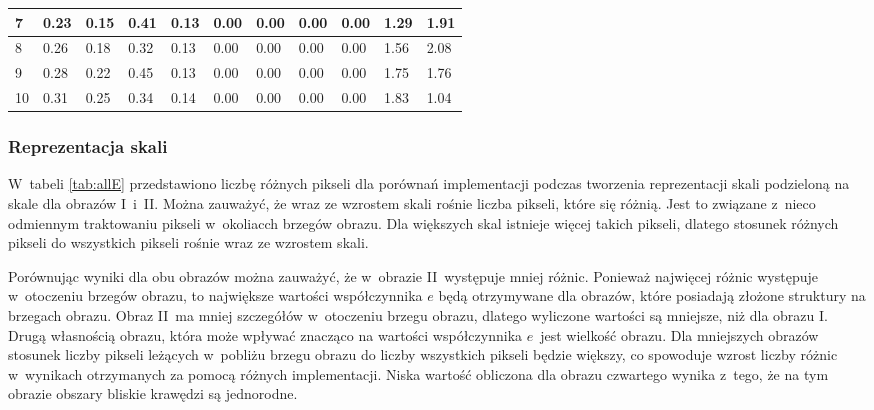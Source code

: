 {\begin{landscape}
\begin{table}[h]
\begin{tabular}{|p{0.8cm}|p{2cm}|p{2cm}|p{2cm}|p{2cm}|p{2cm}|p{2cm}|p{2cm}|p{2cm}|p{2cm}|p{2cm}|}
\multicolumn{1}{|l|}{7}        & 0.23                   & 0.15                   & 0.41                 & 0.13        & 0.00              & 0.00               & 0.00               & 0.00                & 1.29              & 1.91                    \\ \hline
\multicolumn{1}{|l|}{8}        & 0.26                   & 0.18                   & 0.32                 & 0.13        & 0.00              & 0.00               & 0.00               & 0.00                & 1.56              & 2.08                    \\ \hline
\multicolumn{1}{|l|}{9}        & 0.28                   & 0.22                   & 0.45                 & 0.13        & 0.00              & 0.00               & 0.00               & 0.00                & 1.75              & 1.76                    \\ \hline
\multicolumn{1}{|l|}{10}       & 0.31                   & 0.25                   & 0.34                 & 0.14        & 0.00              & 0.00               & 0.00               & 0.00                & 1.83              & 1.04                    \\ \hline
\end{tabular}
\end{table}
\end{landscape}}

\subsubsection{Reprezentacja skali}
\label{subsubsec:reprezentacjaSakliTabele}

W~tabeli \ref{tab:allE} przedstawiono liczbę różnych pikseli dla porównań implementacji podczas tworzenia reprezentacji skali podzieloną na skale dla obrazów I~i~II. Można zauważyć, że wraz ze wzrostem skali rośnie liczba pikseli, które się różnią. Jest to związane z~nieco odmiennym traktowaniu pikseli w~okoliacch brzegów obrazu. Dla większych skal istnieje więcej takich pikseli, dlatego stosunek różnych pikseli do wszystkich pikseli rośnie wraz ze wzrostem skali.

Porównując wyniki dla obu obrazów można zauważyć, że w~obrazie II~występuje mniej różnic. Ponieważ najwięcej różnic występuje w~otoczeniu brzegów obrazu, to największe wartości współczynnika $ e $ będą otrzymywane dla obrazów, które posiadają złożone struktury na brzegach obrazu. Obraz II~ma mniej szczegółów w~otoczeniu brzegu obrazu, dlatego wyliczone wartości są mniejsze, niż dla obrazu I. Drugą własnością obrazu, która może wpływać znacząco na wartości współczynnika $ e $~jest wielkość obrazu. Dla mniejszych obrazów stosunek liczby pikseli leżących w~pobliżu brzegu obrazu do liczby wszystkich pikseli będzie większy, co spowoduje wzrost liczby różnic w~wynikach otrzymanych za pomocą różnych implementacji. Niska wartość obliczona dla obrazu czwartego wynika z~tego, że na tym obrazie obszary bliskie krawędzi są jednorodne.

